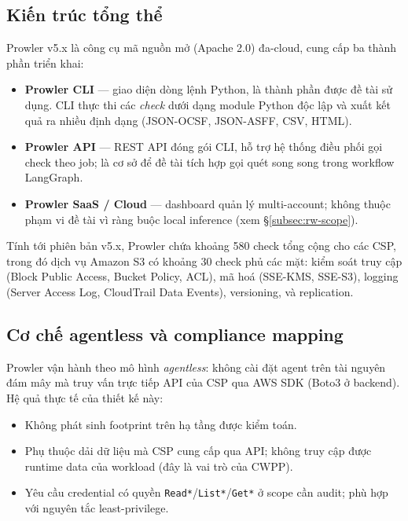 \subsection{Kiến trúc tổng thể}
\label{subsec:prowler-arch}

Prowler v5.x \cite{prowler} là công cụ mã nguồn mở (Apache 2.0) đa-cloud, cung cấp ba thành phần triển khai:
\begin{itemize}
  \item \textbf{Prowler CLI} --- giao diện dòng lệnh Python, là thành phần được đề tài sử dụng. CLI thực thi các \textit{check} dưới dạng module Python độc lập và xuất kết quả ra nhiều định dạng (JSON-OCSF, JSON-ASFF, CSV, HTML).
  \item \textbf{Prowler API} --- REST API đóng gói CLI, hỗ trợ hệ thống điều phối gọi check theo job; là cơ sở để đề tài tích hợp gọi quét song song trong workflow LangGraph.
  \item \textbf{Prowler SaaS / Cloud} --- dashboard quản lý multi-account; không thuộc phạm vi đề tài vì ràng buộc local inference (xem §\ref{subsec:rw-scope}).
\end{itemize}

Tính tới phiên bản v5.x, Prowler chứa khoảng 580 check tổng cộng cho các CSP, trong đó dịch vụ Amazon S3 có khoảng 30 check phủ các mặt: kiểm soát truy cập (Block Public Access, Bucket Policy, ACL), mã hoá (SSE-KMS, SSE-S3), logging (Server Access Log, CloudTrail Data Events), versioning, và replication.

\subsection{Cơ chế agentless và compliance mapping}
\label{subsec:prowler-agentless}

Prowler vận hành theo mô hình \textit{agentless}: không cài đặt agent trên tài nguyên đám mây mà truy vấn trực tiếp API của CSP qua AWS SDK (Boto3 ở backend). Hệ quả thực tế của thiết kế này:
\begin{itemize}
  \item Không phát sinh footprint trên hạ tầng được kiểm toán.
  \item Phụ thuộc dải dữ liệu mà CSP cung cấp qua API; không truy cập được runtime data của workload (đây là vai trò của CWPP).
  \item Yêu cầu credential có quyền \texttt{Read*}/\texttt{List*}/\texttt{Get*} ở scope cần audit; phù hợp với nguyên tắc least-privilege.
\end{itemize}

